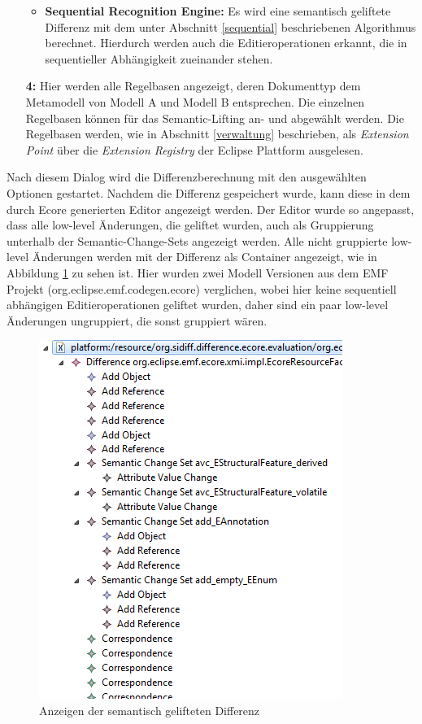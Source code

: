 \begin{itemize}
\begin{itemize}
    \item \textbf{Sequential Recognition Engine:} Es wird eine semantisch geliftete Differenz mit
    dem unter Abschnitt \ref{sequential} beschriebenen Algorithmus berechnet. Hierdurch werden auch
    die Editieroperationen erkannt, die in sequentieller Abhängigkeit zueinander stehen.
  \end{itemize}
 
  \item[\textbf{4:}] Hier werden alle Regelbasen angezeigt, deren Dokumenttyp dem Metamodell von
  Modell A und Modell B entsprechen. Die einzelnen Regelbasen können für das Semantic-Lifting an-
  und abgewählt werden. Die Regelbasen werden, wie in Abschnitt \ref{verwaltung} beschrieben, als
  \textit{Extension Point} über die \textit{Extension Registry} der Eclipse Plattform ausgelesen. 
\end{itemize}
Nach diesem Dialog wird die Differenzberechnung mit den ausgewählten Optionen gestartet. Nachdem die
Differenz gespeichert wurde, kann diese in dem durch Ecore generierten Editor angezeigt werden. Der
Editor wurde so angepasst, dass alle low-level Änderungen, die geliftet wurden, auch als Gruppierung
unterhalb der Semantic-Change-Sets angezeigt werden. Alle nicht gruppierte low-level Änderungen
werden mit der Differenz als Container angezeigt, wie in Abbildung \ref{fig:lifting_sample} zu sehen
ist. Hier wurden zwei Modell Versionen aus dem EMF Projekt (org.eclipse.emf.codegen.ecore)
verglichen, wobei hier keine sequentiell abhängigen Editieroperationen geliftet wurden, daher sind
ein paar low-level Änderungen ungruppiert, die sonst gruppiert wären.

\begin{figure}[htb]
  \centering
  \includegraphics[scale=1.0]{images/lifting_sample.png}
  \caption{Anzeigen der semantisch gelifteten Differenz}
  \label{fig:lifting_sample}
\end{figure}
